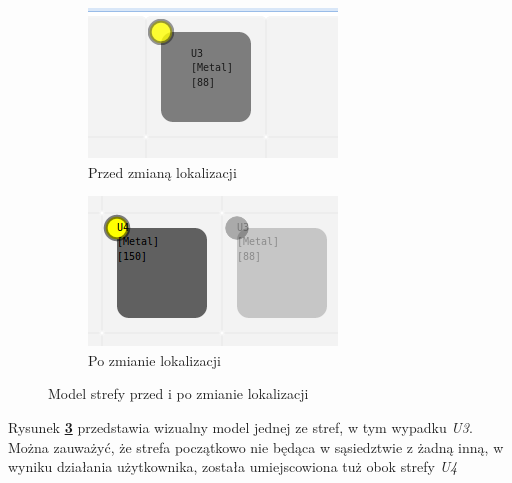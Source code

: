 		\begin{figure}[H]
			\centering  
			\begin{subfigure}[b]{0.4\textwidth}
                \centering
                \includegraphics[width=\textwidth]{images/app/unit_before_move}
                \caption{Przed zmianą lokalizacji}
			\label{c7:fig:app:unit_before_move}
       		\end{subfigure}
			\begin{subfigure}[b]{0.4\textwidth}
                \centering
                \includegraphics[width=\textwidth]{images/app/unit_after_move}
                \caption{Po zmianie lokalizacji}
			\label{c7:fig:app:unit_after_move}
       		\end{subfigure}
       		\caption[Aplikacja - Modelowanie struktury magazynu]{Model strefy przed i po zmianie lokalizacji}
			\label{c7:fig:app:unit_modelling}
		\end{figure} 
		Rysunek \textbf{\ref{c7:fig:app:unit_modelling}} przedstawia wizualny model jednej ze stref, 
		w tym wypadku \textit{U3}. Można zauważyć, że strefa początkowo nie będąca w sąsiedztwie z
		żadną inną, w wyniku działania użytkownika, została umiejscowiona tuż obok strefy \textit{U4}
		
